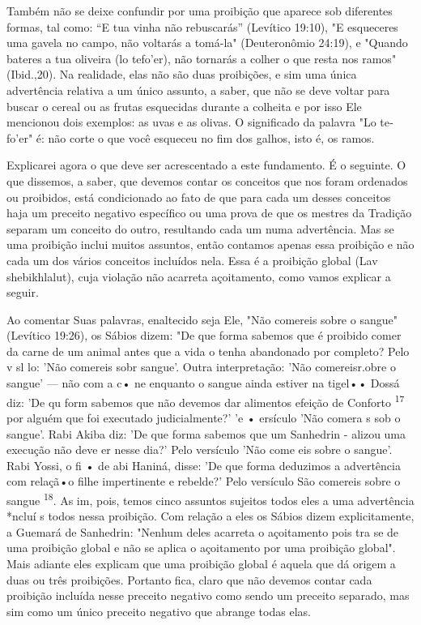 Também não se deixe confundir por uma proibição que aparece sob
diferentes formas, tal como: ``E tua vinha não rebuscarás'' (Levítico
19:10), "E esqueceres uma gavela no campo, não voltarás a tomá-la"
(Deuteronômio 24:19), e "Quando bateres a tua oliveira (lo tefo'er), não
tornarás a colher o que resta nos ramos" (Ibid.,20). Na realidade, elas
não são duas proibições, e sim uma única advertência relativa a um único
assunto, a saber, que não se deve voltar para buscar o cereal ou as
frutas esquecidas durante a colheita e por isso Ele mencionou dois
exemplos: as uvas e as olivas. O significado da palavra "Lo te­fo'er" é:
não corte o que você esqueceu no fim dos galhos, isto é, os ramos.

Explicarei agora o que deve ser acrescentado a este fundamento. É o
seguinte. O que dissemos, a saber, que devemos contar os conceitos que
nos foram ordenados ou proibidos, está condicionado ao fato de que para
cada um desses conceitos haja um preceito negativo específico ou uma
prova de que os mestres da Tradição separam um conceito do outro,
resultando cada um nu­ma advertência. Mas se uma proibição inclui muitos
assuntos, então contamos apenas essa proibição e não cada um dos vários
conceitos incluídos nela. Essa é a proibição global (Lav shebikhlalut),
cuja violação não acarreta açoitamento, como vamos explicar a seguir.

Ao comentar Suas palavras, enaltecido seja Ele, "Não comereis so­bre o
sangue" (Levítico 19:26), os Sábios dizem: "De que forma sabemos que é
proibido comer da carne de um animal antes que a vida o tenha abandonado
por completo? Pelo v sl lo: 'Não comereis sobr sangue'. Outra
interpre­tação: 'Não comereisr.obre o sangue' --- não com a c• ne
enquanto o sangue ainda estiver na tigel•• Dossá diz: 'De qu form
sabemos que não de­vemos dar alimentos efeição de Conforto
\textsuperscript{17} 
por alguém que foi execu­tado judicialmente?' 'e •
ersículo 'Não comera s sob o sangue'. Rabi Akiba diz: 'De que forma
sabemos que um Sanhedrin - alizou uma execução não deve er nesse dia?'
Pelo versículo 'Não come eis sobre o sangue'. Rabi Yossi, o fi • de abi
Haniná, disse: 'De que forma deduzimos a advertência com rela­çã•o filhe
impertinente e rebelde?' Pelo versículo São comereis sobre o san­gue
\textsuperscript{18}. 
As im, pois, temos cinco assuntos
sujeitos todos eles a uma advertên­cia *ncluí s todos nessa
proibição. Com relação a eles os Sábios
dizem expli­citamente, a Guemará de Sanhedrin: "Nenhum deles acarreta o
açoitamento pois tra se de uma proibição global e não se aplica o
açoitamento por uma proibição global". Mais adiante eles explicam que
uma proibição global é aque­la que dá origem a duas ou três proibições.
Portanto fica, claro que não deve­mos contar cada proibição incluída
nesse preceito negativo como sendo um preceito separado, mas sim como um
único preceito negativo que abrange to­das elas.

